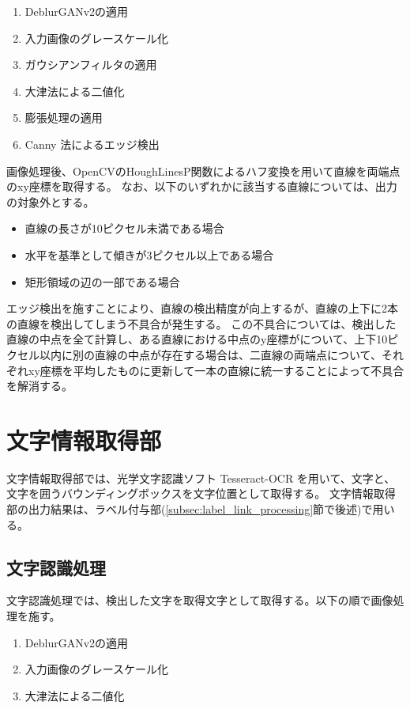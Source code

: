 \begin{enumerate}
    \item DeblurGANv2の適用
    \item 入力画像のグレースケール化
    \item ガウシアンフィルタの適用
    \item 大津法による二値化
    \item 膨張処理の適用
    \item Canny 法によるエッジ検出
\end{enumerate}

画像処理後、OpenCVのHoughLinesP関数によるハフ変換を用いて直線を両端点のxy座標を取得する。
なお、以下のいずれかに該当する直線については、出力の対象外とする。

\begin{itemize}
    \item 直線の長さが10ピクセル未満である場合
    \item 水平を基準として傾きが3ピクセル以上である場合
    \item 矩形領域の辺の一部である場合
\end{itemize}

エッジ検出を施すことにより、直線の検出精度が向上するが、直線の上下に2本の直線を検出してしまう不具合が発生する。
この不具合については、検出した直線の中点を全て計算し、ある直線における中点のy座標がについて、上下10ピクセル以内に別の直線の中点が存在する場合は、二直線の両端点について、それぞれxy座標を平均したものに更新して一本の直線に統一することによって不具合を解消する。



\section{文字情報取得部}\label{sec:OCR_part}
文字情報取得部では、光学文字認識ソフト Tesseract-OCR を用いて、文字と、文字を囲うバウンディングボックスを文字位置として取得する。
文字情報取得部の出力結果は、ラベル付与部(\ref{subsec:label_link_processing}節で後述)で用いる。

\subsection{文字認識処理}\label{subsec:char_recognition_processing}
文字認識処理では、検出した文字を取得文字として取得する。以下の順で画像処理を施す。

\begin{enumerate}
    \item DeblurGANv2の適用
    \item 入力画像のグレースケール化
    \item 大津法による二値化
\end{enumerate}

